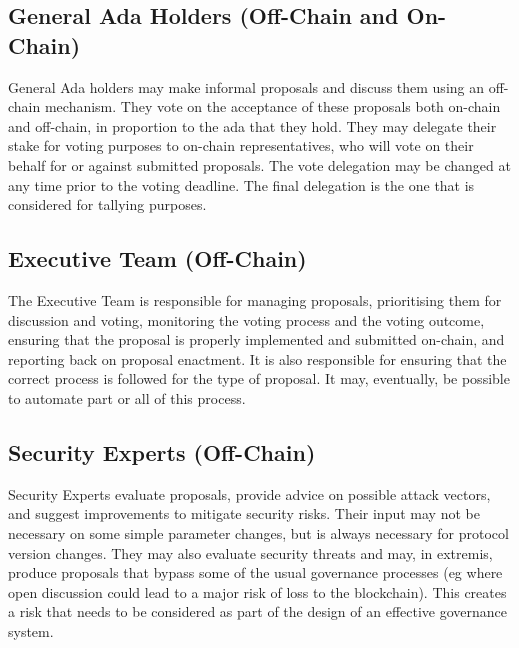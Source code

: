 \subsection{General Ada Holders (Off-Chain and On-Chain)}

General Ada holders may make informal proposals and discuss them using an off-chain mechanism.  They vote on the acceptance of these proposals
both on-chain and off-chain, in proportion to the ada that they hold.  They may delegate their stake for voting purposes to on-chain representatives,
who will vote on their behalf for or against submitted proposals.  The vote delegation may be changed at any time prior to the voting deadline.
The final delegation is the one that is considered for tallying purposes.

\subsection{Executive Team (Off-Chain)}

The Executive Team is responsible for managing proposals, prioritising them for discussion and voting, monitoring the voting process and the
voting outcome, ensuring that the proposal is properly implemented and submitted on-chain, and reporting back on proposal enactment.
It is also responsible for ensuring that the correct process is followed for the type of proposal.  It may, eventually, be possible to automate part or all of this process.

\subsection{Security Experts (Off-Chain)}

Security Experts evaluate proposals, provide advice on possible attack vectors, and suggest improvements to mitigate security risks.
Their input may not be necessary on some simple parameter changes, but is always necessary for protocol version changes.
They may also evaluate security threats and may, in extremis, produce proposals that bypass some of the usual governance processes
(eg where open discussion could lead to a major risk of loss to the blockchain).  This creates a risk that needs to be
considered as part of the design of an effective governance system.

